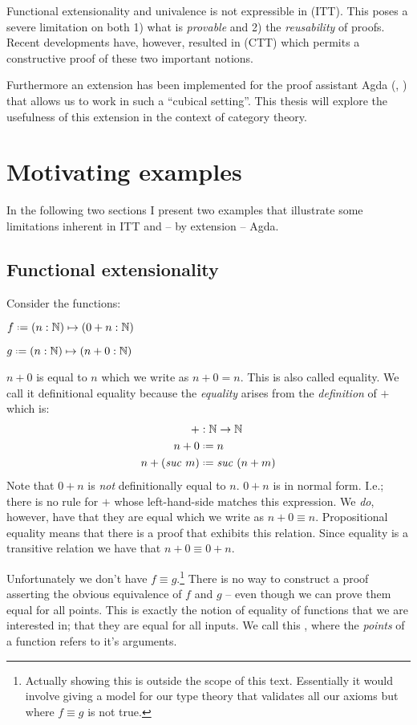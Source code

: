 Functional extensionality and univalence is not expressible in
 (ITT). This poses a severe limitation
on both 1) what is \emph{provable} and 2) the \emph{reusability} of proofs.
Recent developments have, however, resulted in  (CTT)
which permits a constructive proof of these two important notions.

Furthermore an extension has been implemented for the proof assistant Agda
(\cite{agda}, \cite{cubical-agda}) that allows us to work in such a ``cubical
setting''. This thesis will explore the usefulness of this extension in the
context of category theory.
%
\section{Motivating examples}
%
In the following two sections I present two examples that illustrate some
limitations inherent in ITT and -- by extension -- Agda.
%
\subsection{Functional extensionality}
Consider the functions:
%
\begin{multicols}{2}
$f \defeq (n : \bN) \mapsto (0 + n : \bN)$

$g \defeq (n : \bN) \mapsto (n + 0 : \bN)$
\end{multicols}
%
$n + 0$ is  equal to $n$ which we write as $n + 0 = n$.
This is also called  equality. We call it definitional
equality because the \emph{equality} arises from the \emph{definition} of $+$
which is:
%
\newcommand{\suc}[1]{\mathit{suc}\ #1}
\begin{align*}
  +           & : \bN \to \bN              \\
  n + 0       & \defeq n                   \\
  n + (\suc{m}) & \defeq \suc{(n + m)}
\end{align*}
%
Note that $0 + n$ is \emph{not} definitionally equal to $n$. $0 + n$ is in
normal form. I.e.; there is no rule for $+$ whose left-hand-side matches this
expression. We \emph{do}, however, have that they are 
equal which we write as $n + 0 \equiv n$. Propositional equality means that
there is a proof that exhibits this relation. Since equality is a transitive
relation we have that $n + 0 \equiv 0 + n$.

Unfortunately we don't have $f \equiv g$.\footnote{Actually showing this is
outside the scope of this text. Essentially it would involve giving a model
for our type theory that validates all our axioms but where $f \equiv g$ is
not true.} There is no way to construct a proof asserting the obvious
equivalence of $f$ and $g$ -- even though we can prove them equal for all
points. This is exactly the notion of equality of functions that we are
interested in; that they are equal for all inputs. We call this
, where the \emph{points} of a function refers
to it's arguments.

